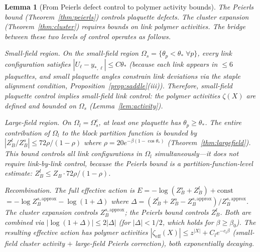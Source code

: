 \documentclass[11pt]{article}
\newtheorem{lemma}[theorem]{Lemma}
\theoremstyle{definition}
\begin{document}
\begin{lemma}[From Peierls defect control to polymer activity bounds]%
\label{lem:peierls-to-polymer}
The Peierls bound (Theorem~\ref{thm:peierls}) controls
\emph{plaquette} defects.  The cluster expansion
(Theorem~\ref{thm:cluster}) requires bounds on \emph{link}
polymer activities.  The bridge between these two levels
of control operates as follows.

\emph{Small-field region.}
On the small-field region $\Omega_s=\{\theta_p<\theta_*\;\forall p\}$,
every link configuration satisfies $|U_\ell-y_{*,\ell}|
\le C\theta_*$ (because each link appears in $\le 6$
plaquettes, and small plaquette angles constrain link deviations
via the staple alignment condition,
Proposition~\ref{prop:saddle}(iii)).
Therefore, small-field plaquette control \emph{implies}
small-field link control: the polymer activities
$\zeta(X)$ are defined and bounded on $\Omega_s$
(Lemma~\ref{lem:activity}).

\emph{Large-field region.}
On $\Omega_l=\Omega_s^c$, at least one plaquette has
$\theta_p\ge\theta_*$.  The entire contribution of $\Omega_l$
to the block partition function is bounded by
$|Z_B^l/Z_B^s|\le 72\rho/(1-\rho)$ where
$\rho=20e^{-\beta(1-\cos\theta_*)}$
(Theorem~\ref{thm:largefield}).
This bound controls \emph{all} link configurations in
$\Omega_l$ simultaneously---it does not require
link-by-link control, because the Peierls bound is a
partition-function-level estimate:
$Z_B^l\le Z_B\cdot 72\rho/(1-\rho)$.

\emph{Recombination.}
The full effective action is $E=-\log(Z_B^s+Z_B^l)+\mathrm{const}$
$=-\log Z_B^{s,\mathrm{approx}}-\log(1+\Delta)$
where $\Delta=(Z_B^l+Z_B^s-Z_B^{s,\mathrm{approx}})
/Z_B^{s,\mathrm{approx}}$.
The cluster expansion controls $Z_B^{s,\mathrm{approx}}$;
the Peierls bound controls $Z_B^l$.  Both are combined via
$|\log(1+\Delta)|\le 2|\Delta|$ (for $|\Delta|<1/2$,
which holds for $\beta\ge\beta_0$).
The resulting effective action has polymer activities
$|\zeta_{\mathrm{eff}}(X)|\le z^{|X|}+C_l e^{-c_l\beta}$
(small-field cluster activity $+$ large-field Peierls
correction), both exponentially decaying.
\end{lemma}
\end{document}
